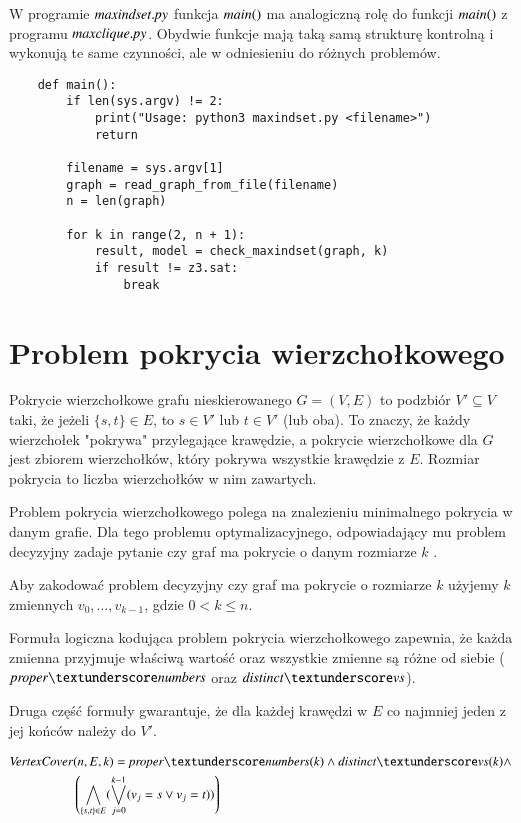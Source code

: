 

W programie ${\mathit{maxindset.py}}$ funkcja ${\mathit{main()}}$ ma analogiczną rolę do funkcji ${\mathit{main()}}$ z programu ${\mathit{maxclique.py}}$. Obydwie funkcje mają taką samą strukturę kontrolną i wykonują te same czynności, ale w odniesieniu do różnych problemów. 

\begin{lstlisting}
	def main():
		if len(sys.argv) != 2:
			print("Usage: python3 maxindset.py <filename>")
			return
		
		filename = sys.argv[1]
		graph = read_graph_from_file(filename)
		n = len(graph)
		
		for k in range(2, n + 1):
			result, model = check_maxindset(graph, k)
			if result != z3.sat:
				break
\end{lstlisting}


\section{Problem pokrycia wierzchołkowego}
Pokrycie wierzchołkowe grafu nieskierowanego $G = (V, E)$ to podzbiór $V' \subseteq V$ taki, że jeżeli $\{s, t\} \in E$, to $s \in V'$ lub $t \in V'$ (lub oba). To znaczy, że każdy wierzchołek "pokrywa" przylegające krawędzie, a pokrycie wierzchołkowe dla \(G\) jest zbiorem wierzchołków, który pokrywa wszystkie krawędzie z \(E\). Rozmiar pokrycia to liczba wierzchołków w nim zawartych.

Problem pokrycia wierzchołkowego polega na znalezieniu minimalnego pokrycia w danym grafie. Dla tego problemu optymalizacyjnego, odpowiadający mu problem decyzyjny zadaje pytanie czy graf ma pokrycie o danym rozmiarze \(k\) \cite{CormenLRS0023376}.

Aby zakodować problem decyzyjny czy graf ma pokrycie o rozmiarze $k$ użyjemy $k$ zmiennych $v_0,\ldots,v_{k-1}$,
gdzie $0 < k \leq n$.

Formuła logiczna kodująca problem pokrycia wierzchołkowego zapewnia, że każda zmienna przyjmuje właściwą wartość oraz wszystkie zmienne są różne od siebie ($\propernumbers$ oraz $\distinctvs$).

Druga część formuły gwarantuje, że dla każdej krawędzi w $E$ co najmniej jeden z jej końców należy do $V'$. 

\begin{align*}
	\VertexCover&(n, E, k) = \propernumbers(k) \land \distinctvs(k) \land \\
	&\left( \bigwedge_{\{s,t\} \in E} (\bigvee_{j=0}^{k-1} (v_j = s \lor v_j = t)) \right)	
\end{align*}



